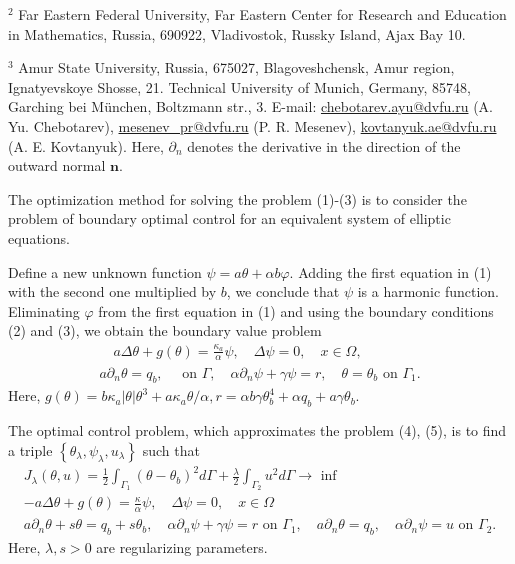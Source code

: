 \documentclass[10pt]{article}
\begin{document}
${ }^{2}$ Far Eastern Federal University, Far Eastern Center for Research and Education in Mathematics, Russia, 690922, Vladivostok, Russky Island, Ajax Bay 10.

${ }^{3}$ Amur State University, Russia, 675027, Blagoveshchensk, Amur region, Ignatyevskoye Shosse, 21. Technical University of Munich, Germany, 85748, Garching bei München, Boltzmann str., 3. E-mail: \href{mailto:chebotarev.ayu@dvfu.ru}{chebotarev.ayu@dvfu.ru} (A. Yu. Chebotarev), \href{mailto:mesenev_pr@dvfu.ru}{mesenev\_pr@dvfu.ru} (P. R. Mesenev), \href{mailto:kovtanyuk.ae@dvfu.ru}{kovtanyuk.ae@dvfu.ru} (A. E. Kovtanyuk). Here, $\partial_{n}$ denotes the derivative in the direction of the outward normal $\mathbf{n}$.

The optimization method for solving the problem (1)-(3) is to consider the problem of boundary optimal control for an equivalent system of elliptic equations.

Define a new unknown function $\psi=a \theta+\alpha b \varphi$. Adding the first equation in (1) with the second one multiplied by $b$, we conclude that $\psi$ is a harmonic function. Eliminating $\varphi$ from the first equation in (1) and using the boundary conditions (2) and (3), we obtain the boundary value problem
$$
\begin{gathered}
\quad a \Delta \theta+g(\theta)=\frac{\kappa_{a}}{\alpha} \psi, \quad \Delta \psi=0, \quad x \in \Omega, \\
a \partial_{n} \theta=q_{b}, \quad \text { on } \Gamma, \quad \alpha \partial_{n} \psi+\gamma \psi=r, \quad \theta=\theta_{b} \text { on } \Gamma_{1} .
\end{gathered}
$$
Here, $g(\theta)=b \kappa_{a}|\theta| \theta^{3}+a \kappa_{a} \theta / \alpha, r=\alpha b \gamma \theta_{b}^{4}+\alpha q_{b}+a \gamma \theta_{b}$.

The optimal control problem, which approximates the problem (4), (5), is to find a triple $\left\{\theta_{\lambda}, \psi_{\lambda}, u_{\lambda}\right\}$ such that
$$
\begin{gathered}
J_{\lambda}(\theta, u)=\frac{1}{2} \int_{\Gamma_{1}}\left(\theta-\theta_{b}\right)^{2} d \Gamma+\frac{\lambda}{2} \int_{\Gamma_{2}} u^{2} d \Gamma \rightarrow \text { inf } \\
-a \Delta \theta+g(\theta)=\frac{\kappa}{\alpha} \psi, \quad \Delta \psi=0, \quad x \in \Omega \\
a \partial_{n} \theta+s \theta=q_{b}+s \theta_{b}, \quad \alpha \partial_{n} \psi+\gamma \psi=r \text { on } \Gamma_{1}, \quad a \partial_{n} \theta=q_{b}, \quad \alpha \partial_{n} \psi=u \text { on } \Gamma_{2} .
\end{gathered}
$$
Here, $\lambda, s>0$ are regularizing parameters.
\end{document}
